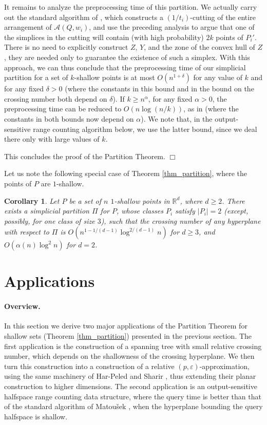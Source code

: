 \documentclass[11pt]{article}
\newtheorem{corollary}[theorem]{Corollary}
\def\reals{\mathbb R}
\def\peps{(p,\varepsilon)}
\begin{document}
It remains to analyze the preprocessing time of this partition. We actually carry out the standard algorithm of \cite{mat92a}, which constructs a $(1/t_{i})$-cutting of the entire arrangement of $\mathcal{A}(Q,w_{i})$, and use the preceding analysis to argue that one of the simplices in the cutting will contain (with high probability) $2k$ points of $P_{i}'$. There is no need to explicitly construct $Z$, $Y$, and the zone of the convex hull of $Z$, they are needed only to guarantee the existence of such a simplex. With this approach, we can thus conclude that the preprocessing time of our simplicial partition for a set of $k$-shallow points is at most $O(n^{1+\delta})$ for any value of $k$ and for any fixed $\delta > 0$ (where the constants in this bound and in the bound on the crossing number both depend on $\delta$). If $k \geq n^{\alpha}$, for any fixed $\alpha > 0$, the preprocessing time can be reduced to $O(n \log (n/k))$, as in \cite{mat92a} (where the constants in both bounds now depend on $\alpha$). We note that, in the output-sensitive range counting algorithm below, we use the latter bound, since we deal there only with large values of $k$.

This concludes the proof of the Partition Theorem. $\Box$


Let us note the following special case of Theorem \ref{thm_partition}, where the points of $P$ are $1$-shallow.

\begin{corollary} \label{corollary_partition_1_shallow}
Let $P$ be a set of $n$ $1$-shallow points in $\reals^{d}$, where $d \geq 2$. There exists a simplicial partition $\Pi$ for $P$, whose classes $P_{i}$ satisfy $|P_{i}| = 2$ (except, possibly, for one class of size $3$), such that the crossing number of any hyperplane with respect to $\Pi$ is $O(n^{1-1/(d-1)} \log^{2/(d-1)}n)$ for $d \geq 3$, and $O(\alpha(n)\log^{2}n)$ for $d = 2$.
\end{corollary}



\section{Applications} \label{section_applications}

\paragraph{Overview.}In this section we derive two major applications of the Partition Theorem for shallow sets (Theorem \ref{thm_partition}) presented in the previous section. The first application is the construction of a spanning tree with small relative crossing number, which depends on the shallowness of the crossing hyperplane. We then turn this construction into a construction of a relative $\peps$-approximation, using the same machinery of Har-Peled and Sharir \cite{hs11}, thus extending their planar construction to higher dimensions. The second application is an output-sensitive halfspace range counting data structure, where the query time is better than that of the standard algorithm of Matou\v{s}ek \cite{mat92a}, when the hyperplane bounding the query halfspace is shallow.
\end{document}
